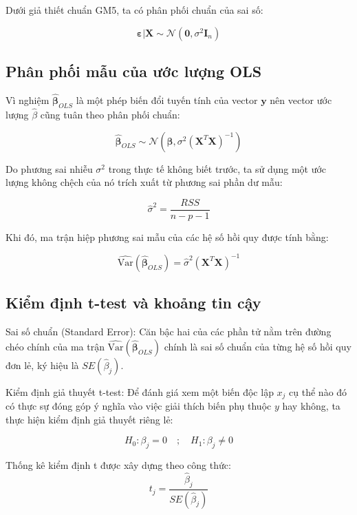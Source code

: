Dưới giả thiết chuẩn GM5, ta có phân phối chuẩn của sai số:

\begin{equation}
    \boldsymbol{\varepsilon} | \mathbf{X} \sim \mathcal{N}(\mathbf{0}, \sigma^2 \mathbf{I}_n)
\end{equation}

\subsection{Phân phối mẫu của ước lượng OLS}

Vì nghiệm $\hat{\boldsymbol{\beta}}_{OLS}$ là một phép biến đổi tuyến tính của vector $\mathbf{y}$ nên vector ước lượng $\hat{\beta}$ cũng tuân theo phân phối chuẩn:

\begin{equation}
    \hat{\boldsymbol{\beta}}_{OLS} \sim \mathcal{N}\left( \boldsymbol{\beta}, \sigma^2 (\mathbf{X}^T\mathbf{X})^{-1} \right)
\end{equation}

Do phương sai nhiễu $\sigma^2$ trong thực tế không biết trước, ta sử dụng một ước lượng không chệch của nó trích xuất từ phương sai phần dư mẫu:

$$\hat{\sigma}^2 = \frac{RSS}{n - p - 1}$$

Khi đó, ma trận hiệp phương sai mẫu của các hệ số hồi quy được tính bằng:

$$\widehat{\text{Var}}(\hat{\boldsymbol{\beta}}_{OLS}) = \hat{\sigma}^2 (\mathbf{X}^T\mathbf{X})^{-1}$$

\subsection{Kiểm định t-test và khoảng tin cậy}

Sai số chuẩn (Standard Error): Căn bậc hai của các phần tử nằm trên đường chéo chính của ma trận $\widehat{\text{Var}}(\hat{\boldsymbol{\beta}}_{OLS})$ chính là sai số chuẩn của từng hệ số hồi quy đơn lẻ, ký hiệu là $SE(\hat{\beta}_j)$.

Kiểm định giả thuyết t-test: Để đánh giá xem một biến độc lập $x_j$ cụ thể nào đó có thực sự đóng góp ý nghĩa vào việc giải thích biến phụ thuộc $y$ hay không, ta thực hiện kiểm định giả thuyết riêng lẻ:

$$H_0: \beta_j = 0 \quad ; \quad H_1: \beta_j \neq 0$$

Thống kê kiểm định t được xây dựng theo công thức: $$t_j = \frac{\hat{\beta}_j}{SE(\hat{\beta}_j)}$$

